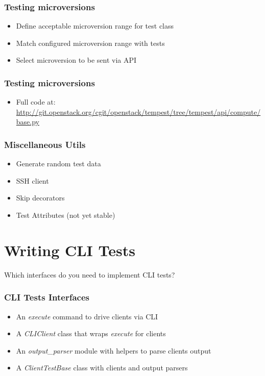\documentclass[aspectratio=169,11pt,hyperref={colorlinks=true}]{beamer}
\begin{document}
\begin{frame}
    \frametitle{Testing microversions}
    \begin{itemize}
        \item Define acceptable microversion range for test class
        \item Match configured microversion range with tests
        \item Select microversion to be sent via API
    \end{itemize}
\end{frame}

\begin{frame}
    \frametitle{Testing microversions}
    
    \begin{itemize}
        \item \tiny Full code at: \href{http://git.openstack.org/cgit/openstack/tempest/tree/tempest/api/compute/base.py}{http://git.openstack.org/cgit/openstack/tempest/tree/tempest/api/compute/base.py}
    \end{itemize}
\end{frame}

\begin{frame}
    \frametitle{Miscellaneous Utils}
    \begin{itemize}
        \item Generate random test data
        \item SSH client
        \item Skip decorators
        \item Test Attributes (not yet stable)
    \end{itemize}
\end{frame}

\section{Writing CLI Tests}
\begin{frame}[c]
    \begin{center}
        \large Which interfaces do you need to implement CLI tests?
    \end{center}
\end{frame}

\begin{frame}
    \frametitle{CLI Tests Interfaces}
    \begin{itemize}
        \item An \emph{execute} command to drive clients via CLI
        \item A \emph{CLIClient} class that wraps \emph{execute} for clients
        \item An \emph{output\_parser} module with helpers to parse clients output
        \item A \emph{ClientTestBase} class with clients and output parsers
    \end{itemize}
\end{frame}
\end{document}
